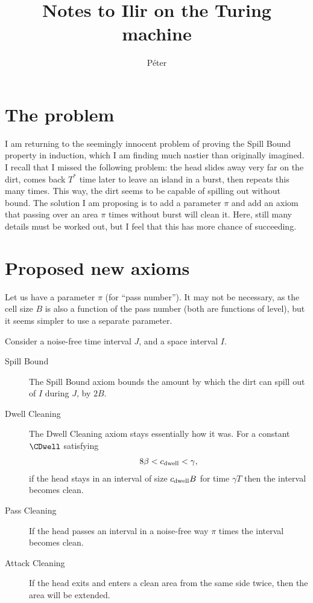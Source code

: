 \documentclass[12pt]{memoir}
\def\B{B}
\newcommand{\Tu}{T}
\newcommand{\Cns}[2]{#1_{\textrm{\upshape #2}}}
\newcommand{\cns}[1]{\Cns{c}{#1}}
\newcommand{\cDwell}{\cns{dwell}}
\begin{document}
\title{Notes to Ilir on the Turing machine}

\author{P\'eter}

\maketitle

\section{The problem}

I am returning to the seemingly innocent problem of proving the Spill Bound property
in induction, which I am finding much nastier than originally imagined.
I recall that I missed the following problem: 
the head slides away very far on the dirt, 
comes back \( \Tu^{*} \) time later to leave an island in a burst, 
then repeats this many times.
This way, the dirt seems to be capable of spilling out without bound.
The solution I am proposing is to add a parameter \( \pi \)
and add an axiom that passing over an area \( \pi \) times without burst will clean it.
Here, still many details must be worked out, but I feel that this has more chance of succeeding.

\section{Proposed new axioms}

Let us have a parameter \( \pi \) (for ``pass number'').
It may not be necessary, as the cell size \( \B \) is also a function of the pass number
(both are functions of level), but it seems simpler to use a separate parameter.

Consider a noise-free time interval \( J \), and a space interval \( I \).

\begin{description}
\item[Spill Bound] 
The Spill Bound axiom bounds the amount by which the dirt can spill out
of \( I \) during \( J \), by \( 2\B \).

\item[Dwell Cleaning]
The Dwell Cleaning axiom stays essentially how it was.
For a constant \( \CDwell \) satisfying
\begin{align}\label{eq:cDwell}
 8\beta<\cDwell < \gamma,
 \end{align}
 if the head stays in an interval of size \( \cDwell\B \) for time \( \gamma\Tu \)
then the interval becomes clean.

\item[Pass Cleaning]
If the head passes an interval in a noise-free way \( \pi \) times
the interval becomes clean.

\item[Attack Cleaning]
If the head exits and enters a clean area from the same side
twice, then the area will be extended.

\end{description}
\end{document}
